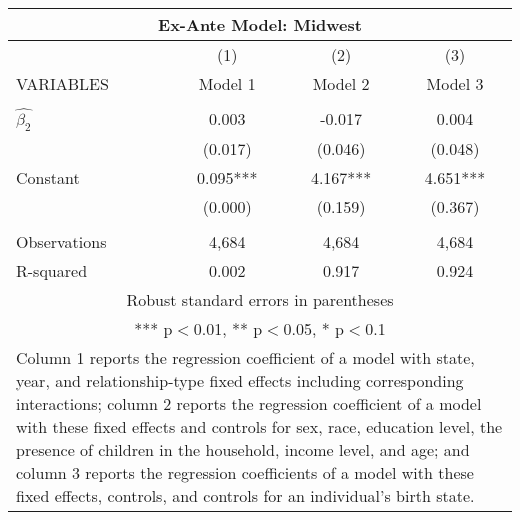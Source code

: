 \begin{tabular}{lccc}
\multicolumn{4}{c}{Ex-Ante Model: Midwest} \\ \hline
 & (1) & (2) & (3) \\
VARIABLES & Model 1 & Model 2 & Model 3 \\ \hline
 &  &  &  \\
$\hat{\beta_2}$ & 0.003 & -0.017 & 0.004 \\
 & (0.017) & (0.046) & (0.048) \\
Constant & 0.095*** & 4.167*** & 4.651*** \\
 & (0.000) & (0.159) & (0.367) \\
 &  &  &  \\
Observations & 4,684 & 4,684 & 4,684 \\
 R-squared & 0.002 & 0.917 & 0.924 \\ \hline
\multicolumn{4}{c}{ Robust standard errors in parentheses} \\
\multicolumn{4}{c}{ *** p$<$0.01, ** p$<$0.05, * p$<$0.1} \\
\multicolumn{4}{p{0.8\linewidth}}{\small Column 1 reports the regression coefficient of a model with state, year, and relationship-type fixed effects including corresponding interactions; column 2 reports the regression coefficient of a model with these fixed effects and controls for sex, race, education level, the presence of children in the household, income level, and age; and column 3 reports the regression coefficients of a model with these fixed effects, controls, and controls for an individual’s birth state.} \\
\end{tabular}
